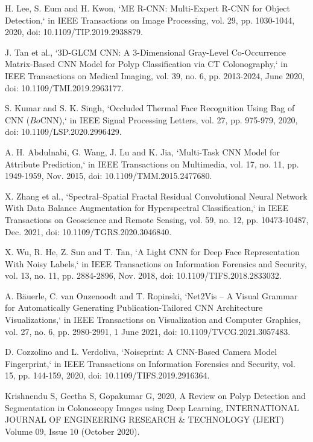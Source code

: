 \documentclass[journal]{IEEEtran}
\begin{document}
\begin{thebibliography}{9}
  H. Lee, S. Eum and H. Kwon, `ME R-CNN: Multi-Expert R-CNN for Object Detection,` in IEEE Transactions on Image Processing, vol. 29, pp. 1030-1044, 2020, doi: 10.1109/TIP.2019.2938879.
  
  J. Tan et al., `3D-GLCM CNN: A 3-Dimensional Gray-Level Co-Occurrence Matrix-Based CNN Model for Polyp Classification via CT Colonography,` in IEEE Transactions on Medical Imaging, vol. 39, no. 6, pp. 2013-2024, June 2020, doi: 10.1109/TMI.2019.2963177.
  
  S. Kumar and S. K. Singh, `Occluded Thermal Face Recognition Using Bag of CNN ($Bo$CNN),` in IEEE Signal Processing Letters, vol. 27, pp. 975-979, 2020, doi: 10.1109/LSP.2020.2996429.
  
  A. H. Abdulnabi, G. Wang, J. Lu and K. Jia, `Multi-Task CNN Model for Attribute Prediction,` in IEEE Transactions on Multimedia, vol. 17, no. 11, pp. 1949-1959, Nov. 2015, doi: 10.1109/TMM.2015.2477680.
  
  X. Zhang et al., `Spectral–Spatial Fractal Residual Convolutional Neural Network With Data Balance Augmentation for Hyperspectral Classification,` in IEEE Transactions on Geoscience and Remote Sensing, vol. 59, no. 12, pp. 10473-10487, Dec. 2021, doi: 10.1109/TGRS.2020.3046840.
  
  X. Wu, R. He, Z. Sun and T. Tan, `A Light CNN for Deep Face Representation With Noisy Labels,` in IEEE Transactions on Information Forensics and Security, vol. 13, no. 11, pp. 2884-2896, Nov. 2018, doi: 10.1109/TIFS.2018.2833032.
  
  A. Bäuerle, C. van Onzenoodt and T. Ropinski, `Net2Vis – A Visual Grammar for Automatically Generating Publication-Tailored CNN Architecture Visualizations,` in IEEE Transactions on Visualization and Computer Graphics, vol. 27, no. 6, pp. 2980-2991, 1 June 2021, doi: 10.1109/TVCG.2021.3057483.
  
  D. Cozzolino and L. Verdoliva, `Noiseprint: A CNN-Based Camera Model Fingerprint,` in IEEE Transactions on Information Forensics and Security, vol. 15, pp. 144-159, 2020, doi: 10.1109/TIFS.2019.2916364.
  
  Krishnendu S, Geetha S, Gopakumar G, 2020, A Review on Polyp Detection and Segmentation in Colonoscopy Images using Deep Learning, INTERNATIONAL JOURNAL OF ENGINEERING RESEARCH & TECHNOLOGY (IJERT) Volume 09, Issue 10 (October 2020).
  \end{thebibliography}
  
\end{document}

